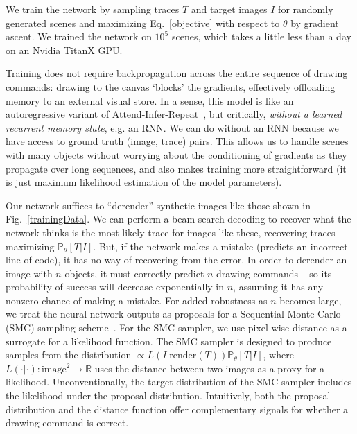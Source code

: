 \documentclass{article}
\newcommand{\probability}{\mathds{P}} %
\begin{document}
We train the network by sampling traces $T$ and target
images $I$ for randomly generated scenes
and maximizing
Eq.~\ref{objective} with respect to $\theta$ by gradient ascent.
We trained the network on $10^5$ scenes, which takes a little less than a day on an Nvidia TitanX GPU.

Training does not require backpropagation across the entire sequence
of drawing commands: drawing to the canvas `blocks' the gradients,
effectively offloading memory to an external visual store.  In a
sense, this model is like an autoregressive variant of
Attend-Infer-Repeat~\cite{eslami1603attend}, but critically, \emph{without a learned
  recurrent memory state}, e.g. an RNN.  We can do without an RNN
because we have access to ground truth (image, trace) pairs.  This
allows us to handle scenes with many objects without
worrying about the conditioning of gradients as they propagate
over long sequences, and also makes training more straightforward (it
is just maximum likelihood estimation of the model parameters).



Our network suffices to ``derender'' synthetic images like those shown in
Fig.~\ref{trainingData}.  We can perform a beam search decoding to
recover what the network thinks is the most likely trace for
images like these, recovering traces maximizing $\probability_\theta
[T|I]$. But, if the network makes a mistake (predicts an incorrect
line of code), it has no way of recovering from the error.  In order
to derender an image with $n$ objects, it must correctly predict $n$
drawing commands -- so its probability of success will decrease
exponentially in $n$, assuming it has any nonzero chance of making a
mistake.  For added robustness as $n$ becomes large, we treat the
neural network outputs as proposals for a Sequential Monte Carlo (SMC) sampling scheme~\cite{SMCBook}.  For
the SMC sampler, we use pixel-wise distance as a surrogate for a
likelihood function. The SMC sampler is designed to produce samples
from the distribution $\propto L(I|\text{render}(T))
\probability_\theta[T|I]$, where $L(\cdot | \cdot):\text{image}^2\to
\mathbb{R}$ uses the distance between two images as a proxy for a
likelihood. Unconventionally, the target distribution of the SMC sampler
includes the likelihood under the proposal distribution.
Intuitively, both the proposal
distribution and the distance function offer complementary signals for
whether a drawing command is correct.
\end{document}
